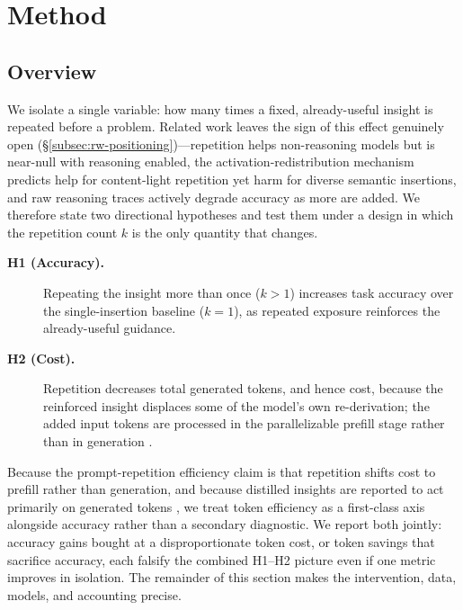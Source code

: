 \section{Method}
\label{sec:method}

\subsection{Overview}
\label{sec:overview}

We isolate a single variable: how many times a fixed, already-useful insight is
repeated before a problem. Related work leaves the sign of this effect genuinely
open (\S\ref{subsec:rw-positioning})---repetition helps non-reasoning models but is
near-null with reasoning enabled, the activation-redistribution mechanism predicts
help for content-light repetition yet harm for diverse semantic insertions, and raw
reasoning traces actively degrade accuracy as more are added. We therefore state two
directional hypotheses and test them under a design in which the repetition count
$k$ is the only quantity that changes.

\begin{description}
  \item[\textbf{H1 (Accuracy).}] Repeating the insight more than once
        ($k>1$) increases task accuracy over the single-insertion baseline
        ($k{=}1$), as repeated exposure reinforces the already-useful guidance.
  \item[\textbf{H2 (Cost).}] Repetition decreases total generated tokens, and
        hence cost, because the reinforced insight displaces some of the model's
        own re-derivation; the added input tokens are processed in the
        parallelizable prefill stage rather than in generation
        \citep{leviathan2025prompt, zhao2026trs}.
\end{description}

Because the prompt-repetition efficiency claim is that repetition shifts cost to
prefill rather than generation, and because distilled insights are reported to act
primarily on generated tokens \citep{zhao2026trs}, we treat token efficiency as a
first-class axis alongside accuracy rather than a secondary diagnostic. We report
both jointly: accuracy gains bought at a disproportionate token cost, or token
savings that sacrifice accuracy, each falsify the combined H1--H2 picture even if one
metric improves in isolation. The remainder of this section makes the intervention,
data, models, and accounting precise.

